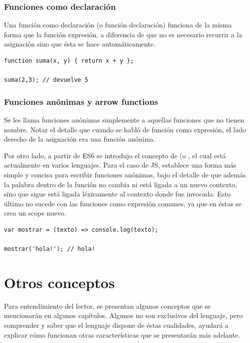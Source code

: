 \subsubsection{Funciones como declaración}

Una función como declaración (o función declaración) funciona de la misma forma que la función expresión, a diferencia de que no es necesario recurrir a la asignación sino que ésta se hace automáticamente.

\begin{lstlisting}[title={Función declaración}]
function suma(x, y) { return x + y };

suma(2,3); // devuelve 5
\end{lstlisting}

\subsubsection{Funciones anónimas y arrow functions}

Se les llama funciones anónimas simplemente a aquellas funciones que no tienen nombre. Notar el detalle que cuando se habló de función como expresión, el lado derecho de la asignación era una función anónima.

Por otro lado, a partir de ES6 se introdujo el concepto de  (o , el cual está actualmente en varios lenguajes. Para el caso de JS, establece una forma más simple y concisa para escribir funciones anónimas, bajo el detalle de que además la palabra  dentro de la función no cambia ni está ligada a un nuevo contexto, sino que sigue está ligada léxicamente al contexto donde fue invocada. Esto último no sucede con las funciones como expresión comunes, ya que en éstas se crea un scope nuevo.

\begin{lstlisting}[title={\code{Arrow function}}]
var mostrar = (texto) => console.log(texto);

mostrar('hola!'); // hola!
\end{lstlisting}

\section{Otros conceptos}

Para entendimiento del lector, se presentan algunos conceptos que se mencionarán en algunos capítulos. Algunos no son exclusivos del lenguaje, pero comprender y saber que el lenguaje dispone de éstas cualidades, ayudará a explicar cómo funcionan otras características que se presentarán más adelante.

